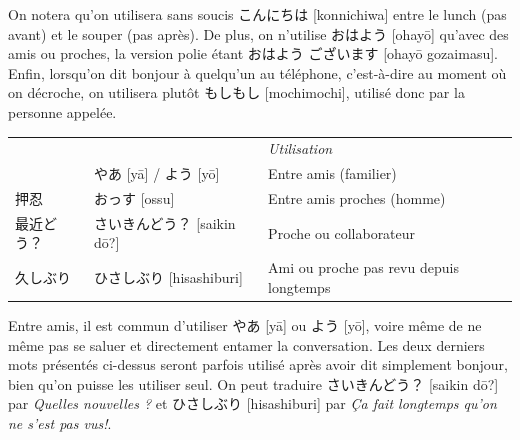 \documentclass[a4paper,11pt,final]{article}
\newcommand{\sectit}[1]{\bigskip\hspace{-5mm}{\color{sectionblue}$\blacksquare$~~\Large\bfseries #1}}
\newcommand{\romaji}[1]{{\footnotesize[#1]}}
\begin{document}
On notera qu'on utilisera sans soucis こんにちは \romaji{konnichiwa} entre le
lunch (pas avant) et le souper (pas après). De plus, on n'utilise おはよう
\romaji{ohay\=o} qu'avec des amis ou proches, la version polie étant おはよう
ございます \romaji{ohay\=o gozaimasu}. Enfin, lorsqu'on dit bonjour à quelqu'un
au téléphone, c'est-à-dire au moment où on décroche, on utilisera plutôt
もしもし \romaji{mochimochi}, utilisé donc par la personne appelée.

\begin{center}
\end{center}


\sectit{Discours informel}

\hspace{5mm}\begin{tabular}{|p{2cm}p{4.5cm}l}
    \multicolumn{1}{l}{}&& \it\small Utilisation \\
                    & やあ \romaji{y\=a} / よう \romaji{y\=o}    & Entre amis
    (familier) \\
    押忍          & おっす \romaji{ossu}                        & Entre amis
    proches (homme) \\
    最近どう？ & さいきんどう？ \romaji{saikin d\=o?}    & Proche ou
    collaborateur \\
    久しぶり    & ひさしぶり \romaji{hisashiburi}           & Ami ou proche pas
    revu depuis longtemps
\end{tabular}

Entre amis, il est commun d'utiliser やあ \romaji{y\=a} ou よう \romaji{y\=o},
voire même de ne même pas se saluer et directement entamer la conversation. Les
deux derniers mots présentés ci-dessus seront parfois utilisé après avoir dit
simplement bonjour, bien qu'on puisse les utiliser seul. On peut traduire
さいきんどう？ \romaji{saikin d\=o?} par \og\textit{Quelles nouvelles ?}\fg{} et
ひさしぶり \romaji{hisashiburi} par \og\textit{Ça fait longtemps qu'on ne s'est
pas vus!}\fg.
\end{document}
